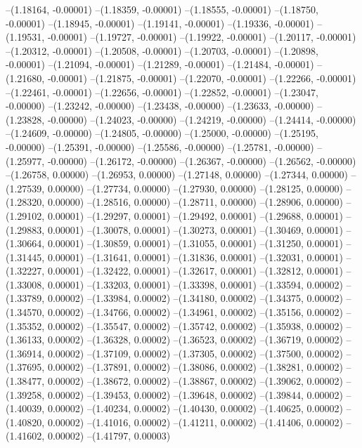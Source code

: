 --(1.18164, -0.00001)
--(1.18359, -0.00001)
--(1.18555, -0.00001)
--(1.18750, -0.00001)
--(1.18945, -0.00001)
--(1.19141, -0.00001)
--(1.19336, -0.00001)
--(1.19531, -0.00001)
--(1.19727, -0.00001)
--(1.19922, -0.00001)
--(1.20117, -0.00001)
--(1.20312, -0.00001)
--(1.20508, -0.00001)
--(1.20703, -0.00001)
--(1.20898, -0.00001)
--(1.21094, -0.00001)
--(1.21289, -0.00001)
--(1.21484, -0.00001)
--(1.21680, -0.00001)
--(1.21875, -0.00001)
--(1.22070, -0.00001)
--(1.22266, -0.00001)
--(1.22461, -0.00001)
--(1.22656, -0.00001)
--(1.22852, -0.00001)
--(1.23047, -0.00000)
--(1.23242, -0.00000)
--(1.23438, -0.00000)
--(1.23633, -0.00000)
--(1.23828, -0.00000)
--(1.24023, -0.00000)
--(1.24219, -0.00000)
--(1.24414, -0.00000)
--(1.24609, -0.00000)
--(1.24805, -0.00000)
--(1.25000, -0.00000)
--(1.25195, -0.00000)
--(1.25391, -0.00000)
--(1.25586, -0.00000)
--(1.25781, -0.00000)
--(1.25977, -0.00000)
--(1.26172, -0.00000)
--(1.26367, -0.00000)
--(1.26562, -0.00000)
--(1.26758, 0.00000)
--(1.26953, 0.00000)
--(1.27148, 0.00000)
--(1.27344, 0.00000)
--(1.27539, 0.00000)
--(1.27734, 0.00000)
--(1.27930, 0.00000)
--(1.28125, 0.00000)
--(1.28320, 0.00000)
--(1.28516, 0.00000)
--(1.28711, 0.00000)
--(1.28906, 0.00000)
--(1.29102, 0.00001)
--(1.29297, 0.00001)
--(1.29492, 0.00001)
--(1.29688, 0.00001)
--(1.29883, 0.00001)
--(1.30078, 0.00001)
--(1.30273, 0.00001)
--(1.30469, 0.00001)
--(1.30664, 0.00001)
--(1.30859, 0.00001)
--(1.31055, 0.00001)
--(1.31250, 0.00001)
--(1.31445, 0.00001)
--(1.31641, 0.00001)
--(1.31836, 0.00001)
--(1.32031, 0.00001)
--(1.32227, 0.00001)
--(1.32422, 0.00001)
--(1.32617, 0.00001)
--(1.32812, 0.00001)
--(1.33008, 0.00001)
--(1.33203, 0.00001)
--(1.33398, 0.00001)
--(1.33594, 0.00002)
--(1.33789, 0.00002)
--(1.33984, 0.00002)
--(1.34180, 0.00002)
--(1.34375, 0.00002)
--(1.34570, 0.00002)
--(1.34766, 0.00002)
--(1.34961, 0.00002)
--(1.35156, 0.00002)
--(1.35352, 0.00002)
--(1.35547, 0.00002)
--(1.35742, 0.00002)
--(1.35938, 0.00002)
--(1.36133, 0.00002)
--(1.36328, 0.00002)
--(1.36523, 0.00002)
--(1.36719, 0.00002)
--(1.36914, 0.00002)
--(1.37109, 0.00002)
--(1.37305, 0.00002)
--(1.37500, 0.00002)
--(1.37695, 0.00002)
--(1.37891, 0.00002)
--(1.38086, 0.00002)
--(1.38281, 0.00002)
--(1.38477, 0.00002)
--(1.38672, 0.00002)
--(1.38867, 0.00002)
--(1.39062, 0.00002)
--(1.39258, 0.00002)
--(1.39453, 0.00002)
--(1.39648, 0.00002)
--(1.39844, 0.00002)
--(1.40039, 0.00002)
--(1.40234, 0.00002)
--(1.40430, 0.00002)
--(1.40625, 0.00002)
--(1.40820, 0.00002)
--(1.41016, 0.00002)
--(1.41211, 0.00002)
--(1.41406, 0.00002)
--(1.41602, 0.00002)
--(1.41797, 0.00003)
